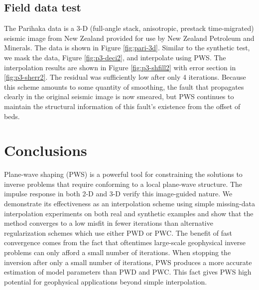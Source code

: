 \subsection{Field data test}
The Parihaka data is a 3-D (full-angle stack, anisotropic, prestack time-migrated) seismic image from New Zealand provided for use by New Zealand Petroleum and Minerals. The data is shown in Figure \ref{fig:pari-3d}. Similar to the synthetic test, we mask the data, Figure \ref{fig:p3-deci2}, and interpolate using PWS. The interpolation results are shown in Figure \ref{fig:p3-shfill2} with error section in \ref{fig:p3-sherr2}. The residual was sufficiently low after only 4 iterations.  Because this scheme amounts to some quantity of smoothing, the fault that propagates clearly in the original seismic image is now smeared, but PWS continues to maintain the structural information of this fault's existence from the offset of beds.

\section{Conclusions}
Plane-wave shaping (PWS) is a powerful tool for constraining the solutions to inverse problems that require conforming to a local plane-wave structure. The impulse response in both 2-D and 3-D verify this image-guided nature. We demonstrate its effectiveness as an interpolation scheme using simple missing-data interpolation experiments on both real and synthetic examples and show that the method converges to a low misfit in fewer iterations than alternative regularization schemes which use either PWD or PWC. The benefit of fast convergence comes from the fact that oftentimes large-scale geophysical inverse problems can only afford a small number of iterations. When stopping the inversion after only a small number of iterations, PWS produces a more accurate estimation of model parameters than PWD and PWC. This fact gives PWS high potential for geophysical applications beyond simple interpolation.






